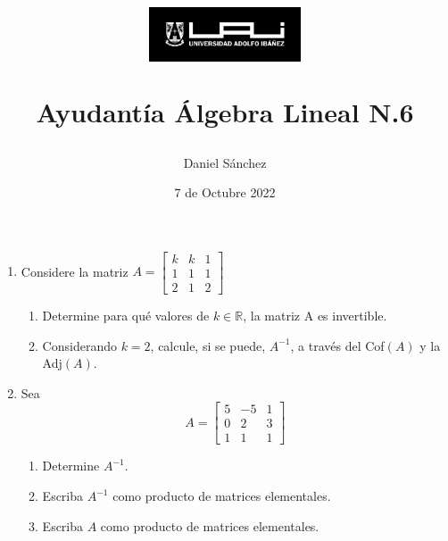 \documentclass[12pt]{article}
\begin{document}
\title{
    \begin{figure}[ht]
        \centering
        \includegraphics[width = 0.4\textwidth, ]{../../logo-uai.jpg}\\
    \end{figure}
    Ayudant\'ia \'Algebra Lineal N.6}
\date{7 de Octubre 2022}
\author{Daniel S\'anchez}
\maketitle

\begin{enumerate}

    \item Considere la matriz $A=\begin{bmatrix}
                  k & k & 1 \\
                  1 & 1 & 1 \\
                  2 & 1 & 2
              \end{bmatrix}$
          \begin{enumerate}
              \item Determine para qu\'e valores de $k \in \mathbb{R}$, la matriz A es invertible.
              \item Considerando $k=2$, calcule, si se puede, $A^{-1}$, a trav\'es del Cof$(A)$ y la Adj$(A)$.
          \end{enumerate}

    \item Sea
          $$A=\begin{bmatrix}
                  5 & -5 & 1 \\
                  0 & 2  & 3 \\
                  1 & 1  & 1
              \end{bmatrix}$$
          \begin{enumerate}
              \item Determine $A^{-1}$.
              \item Escriba $A^{-1}$ como producto de matrices elementales.
              \item Escriba $A$ como producto de matrices elementales.
          \end{enumerate}


\end{enumerate}
\end{document}
